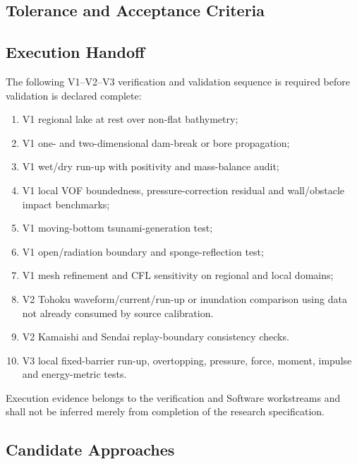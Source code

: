 \subsection{Tolerance and Acceptance Criteria}
\label{sec:res-ver-spec-tolerance-acceptance-criteria}


\subsection{Execution Handoff}
\label{sec:res-ver-spec-execution-handoff}

The following V1--V2--V3 verification and validation sequence is
required before validation is declared complete:

\begin{enumerate}
  \item V1 regional lake at rest over non-flat bathymetry;
  \item V1 one- and two-dimensional dam-break or bore propagation;
  \item V1 wet/dry run-up with positivity and mass-balance audit;
  \item V1 local VOF boundedness, pressure-correction residual and
    wall/obstacle impact benchmarks;
  \item V1 moving-bottom tsunami-generation test;
  \item V1 open/radiation boundary and sponge-reflection test;
  \item V1 mesh refinement and CFL sensitivity on regional and local
    domains;
  \item V2 Tohoku waveform/current/run-up or inundation comparison using
    data not already consumed by source calibration.
  \item V2 Kamaishi and Sendai replay-boundary consistency checks.
  \item V3 local fixed-barrier run-up, overtopping, pressure, force,
    moment, impulse and energy-metric tests.
\end{enumerate}

Execution evidence belongs to the verification and Software workstreams
and shall not be inferred merely from completion of the research
specification.

\subsection{Candidate Approaches}
\label{sec:res-ver-spec-candidate-approaches}

